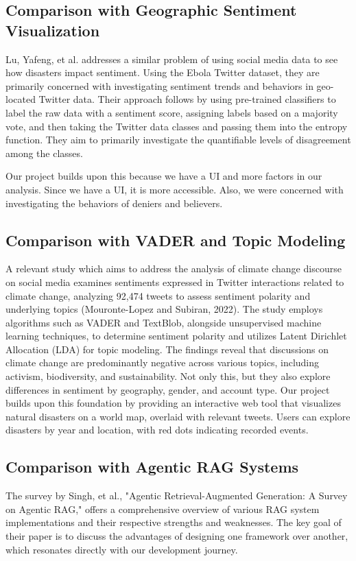 \documentclass{ieeeaccess}
\begin{document}
\subsection{Comparison with Geographic Sentiment Visualization}
Lu, Yafeng, et al. addresses a similar problem of using social media data to see how disasters impact sentiment. Using the Ebola Twitter dataset, they are primarily concerned with investigating sentiment trends and behaviors in geo-located Twitter data. Their approach follows by using pre-trained classifiers to label the raw data with a sentiment score, assigning labels based on a majority vote, and then taking the Twitter data classes and passing them into the entropy function. They aim to primarily investigate the quantifiable levels of disagreement among the classes.

Our project builds upon this because we have a UI and more factors in our analysis. Since we have a UI, it is more accessible. Also, we were concerned with investigating the behaviors of deniers and believers.

\subsection{Comparison with VADER and Topic Modeling}
A relevant study which aims to address the analysis of climate change discourse on social media examines sentiments expressed in Twitter interactions related to climate change, analyzing 92,474 tweets to assess sentiment polarity and underlying topics (Mouronte-Lopez and Subiran, 2022). The study employs algorithms such as VADER and TextBlob, alongside unsupervised machine learning techniques, to determine sentiment polarity and utilizes Latent Dirichlet Allocation (LDA) for topic modeling. The findings reveal that discussions on climate change are predominantly negative across various topics, including activism, biodiversity, and sustainability. Not only this, but they also explore differences in sentiment by geography, gender, and account type. Our project builds upon this foundation by providing an interactive web tool that visualizes natural disasters on a world map, overlaid with relevant tweets. Users can explore disasters by year and location, with red dots indicating recorded events.

\subsection{Comparison with Agentic RAG Systems}
The survey by Singh, et al., "Agentic Retrieval-Augmented Generation: A Survey on Agentic RAG," offers a comprehensive overview of various RAG system implementations and their respective strengths and weaknesses. The key goal of their paper is to discuss the advantages of designing one framework over another, which resonates directly with our development journey.
\end{document}
